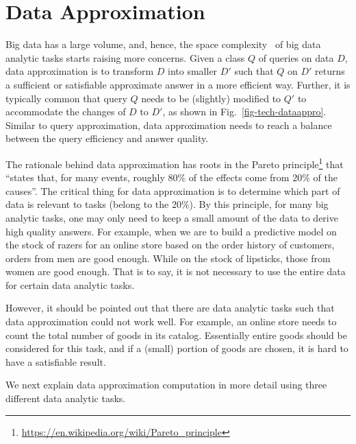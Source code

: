 \section{Data Approximation}
\label{sec-data}






Big data has a large volume, and, hence, the space complexity~\cite{CormenLRS01} of big data analytic tasks starts raising more concerns.
Given a class $Q$ of queries on data $D$, data approximation is to transform $D$ into smaller $D'$ such that $Q$ on $D'$ returns a sufficient or satisfiable approximate answer in a more efficient way. Further, it is typically common that query $Q$ needs to be (slightly) modified to $Q'$ to accommodate  the changes of $D$ to $D'$, as shown in Fig.~\ref{fig-tech-dataappro}. Similar to query approximation, data approximation needs to reach a balance between the query efficiency and answer quality.


The rationale behind data approximation has roots in the Pareto principle\footnote{\small \url{https://en.wikipedia.org/wiki/Pareto_principle}} that ``states that, for many events, roughly 80\% of the effects come from 20\% of the causes''. The critical thing for data approximation is to determine which part of data is relevant to tasks (belong to the 20\%).
 By this principle, for many big analytic tasks, one may only need to keep a small amount of the data to derive high quality answers.
For example, when we are to build a predictive model on the stock of razers for an online store based on the order history of customers, orders from men are good enough. While on the stock of lipsticks, those from women are good enough. That is to say,  it is not necessary to use the entire data for certain data analytic tasks.



However, it should be pointed out that there are data analytic tasks such that data approximation could not work well. For example, an online store needs to count the total number of goods in its catalog.  Essentially entire goods should be considered for this task, and if a (small) portion of goods are chosen, it is hard to have a satisfiable result.


We next explain data approximation computation in more detail using three different data analytic tasks.

